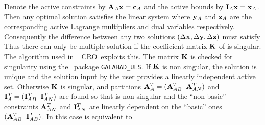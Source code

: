 \documentclass{galahad}
\newcommand{\packagename}{CRO}
\newcommand{\fullpackagename}{\libraryname\_\packagename}
\begin{document}
Denote the active constraints by ${\mathbf{A}}_A {\mathbf{x}} = {\mathbf{c}}_A$ and the
active bounds by ${\mathbf{I}}_A {\mathbf{x}} = {\mathbf{x}}_A$. Then any optimal solution satisfies
the linear system
where ${\mathbf{y}}_A$ and ${\mathbf{z}}_A$ are the corresponding active Lagrange multipliers
and dual variables respectively. Consequently the difference between
any two solutions $(\Delta {\mathbf{x}}, \Delta {\mathbf{y}}, \Delta {\mathbf{z}})$ must satisfy
Thus there can only be multiple solution if the coefficient matrix ${\mathbf{K}}$
of  is singular. The algorithm used in \fullpackagename\
exploits this. The matrix ${\mathbf{K}}$ is checked for singularity
using the \galahad\ package {\tt GALAHAD\_ULS}. If ${\mathbf{K}}$ is
non singular, the solution is unique and the solution input by the user
provides a linearly independent active set. Otherwise ${\mathbf{K}}$ is singular,
and partitions ${\mathbf{A}}_A^T = ( {\mathbf{A}}_{AB}^T \;\; {\mathbf{A}}_{AN}^T)$ and
${\mathbf{I}}_A^T = ( {\mathbf{I}}_{AB}^T \;\; {\mathbf{I}}_{AN}^T)$ are found so that
\disp{
 \mat{ccc}{\bmH & - \bmA_{AB}^T & - \bmI^T_{AB} \\ \bmA_{AB} & 0 & 0 \\
 \bmI_{AB} & 0 & 0 }}
is non-singular and the ``non-basic'' constraints ${\mathbf{A}}_{AN}^T$
and ${\mathbf{I}}_{AN}^T$ are linearly dependent on the ``basic'' ones
$( {\mathbf{A}}_{AB}^T \;\; {\mathbf{I}}_{AB}^T)$. In this case  is equivalent to
\end{document}
